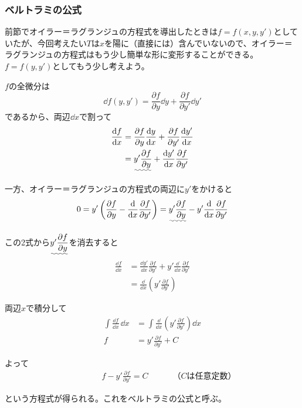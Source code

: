 \subsubsection{ベルトラミの公式}
前節でオイラー＝ラグランジュの方程式を導出したときは$f = f(x,y,y')$としていたが、今回考えたい$T$は$x$を陽に（直接には）含んでいないので、オイラー＝ラグランジュの方程式はもう少し簡単な形に変形することができる。$f = f(y,y')$としてもう少し考えよう。\par
$f$の全微分は
$$\dd f(y,y') = \frac{\partial f}{\partial y}\dd y + \frac{\partial f}{\partial y'}\dd y'$$
であるから、両辺$\dd x$で割って
\begin{align*}
  \frac{\dd f}{\dd x} &= \frac{\partial f}{\partial y} \frac{\dd y}{\dd x} + \frac{\partial f}{\partial y'} \frac{\dd y'}{\dd x} \\
  &= \uwave{y'\frac{\partial f}{\partial y}} + \frac{\dd y'}{\dd x} \frac{\partial f}{\partial y'}
\end{align*}\par
一方、オイラー＝ラグランジュの方程式の両辺に$y'$をかけると
$$0 = y'\left( \frac{\partial f}{\partial y} - \frac{\dd}{\dd x}\frac{\partial f}{\partial y'} \right)
= \uwave{y'\frac{\partial f}{\partial y}} - y'\frac{\dd}{\dd x}\frac{\partial f}{\partial y'}$$\par
この2式から$\uwave{y'\dfrac{\partial f}{\partial y}}$を消去すると
\begin{align*}
  \frac{\dd f}{\dd x} &= \frac{\dd y'}{\dd x} \frac{\partial f}{\partial y'} + y'\frac{\dd}{\dd x}\frac{\partial f}{\partial y'} \\
  &= \frac{\dd}{\dd x} \left( y'\frac{\partial f}{\partial y'} \right)
\end{align*}\par
両辺$x$で積分して
\begin{align*}
  \int \frac{\dd f}{\dd x} \,\dd x &= \int \frac{\dd}{\dd x} \left( y'\frac{\partial f}{\partial y'} \right) \dd x \\
  f &= y'\frac{\partial f}{\partial y'} + C
\end{align*}\par
よって
\begin{align*}
  \qquad\qquad f - y'\frac{\partial f}{\partial y'} = C \qquad\quad\text{（$C$は任意定数）}
\end{align*}\par
という方程式が得られる。これをベルトラミの公式と呼ぶ。

